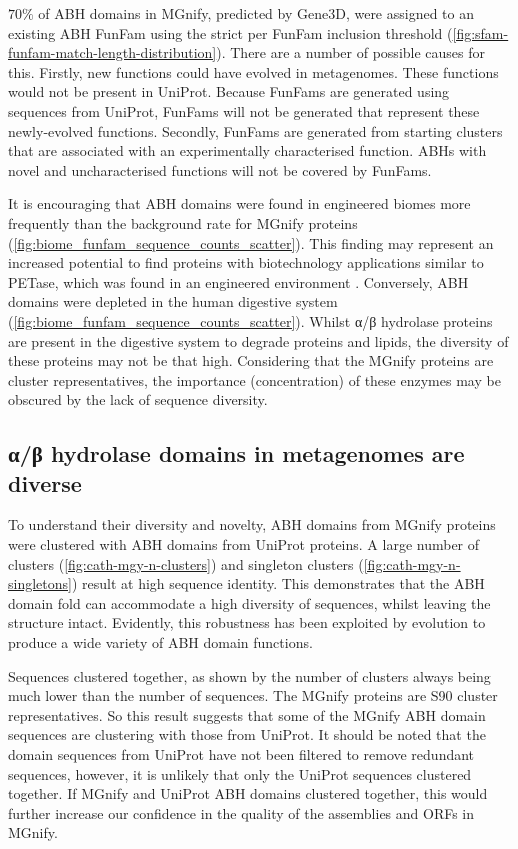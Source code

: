 $70\%$ of ABH domains in MGnify, predicted by Gene$3$D, were assigned to an existing ABH FunFam using the strict per FunFam inclusion threshold (\ref{fig:sfam-funfam-match-length-distribution}). There are a number of possible causes for this. Firstly, new functions could have evolved in metagenomes. These functions would not be present in UniProt. Because FunFams are generated using sequences from UniProt, FunFams will not be generated that represent these newly-evolved functions. Secondly, FunFams are generated from starting clusters that are associated with an experimentally characterised function. ABHs with novel and uncharacterised functions will not be covered by FunFams.

It is encouraging that ABH domains were found in engineered biomes more frequently than the background rate for MGnify proteins (\ref{fig:biome_funfam_sequence_counts_scatter}). This finding may represent an increased potential to find proteins with biotechnology applications similar to PETase, which was found in an engineered environment \cite{Yoshida2016}. Conversely, ABH domains were depleted in the human digestive system (\ref{fig:biome_funfam_sequence_counts_scatter}). Whilst α/β hydrolase proteins are present in the digestive system to degrade proteins and lipids, the diversity of these proteins may not be that high. Considering that the MGnify proteins are cluster representatives, the importance (concentration) of these enzymes may be obscured by the lack of sequence diversity.

\subsection{α/β hydrolase domains in metagenomes are diverse}

To understand their diversity and novelty, ABH domains from MGnify proteins were clustered with ABH domains from UniProt proteins. A large number of clusters (\ref{fig:cath-mgy-n-clusters}) and singleton clusters (\ref{fig:cath-mgy-n-singletons}) result at high sequence identity. This demonstrates that the ABH domain fold can accommodate a high diversity of sequences, whilst leaving the structure intact. Evidently, this robustness has been exploited by evolution to produce a wide variety of ABH domain functions.

Sequences clustered together, as shown by the number of clusters always being much lower than the number of sequences. The MGnify proteins are S90 cluster representatives. So this result suggests that some of the MGnify ABH domain sequences are clustering with those from UniProt. It should be noted that the domain sequences from UniProt have not been filtered to remove redundant sequences, however, it is unlikely that only the UniProt sequences clustered together. If MGnify and UniProt ABH domains clustered together, this would further increase our confidence in the quality of the assemblies and ORFs in MGnify.

